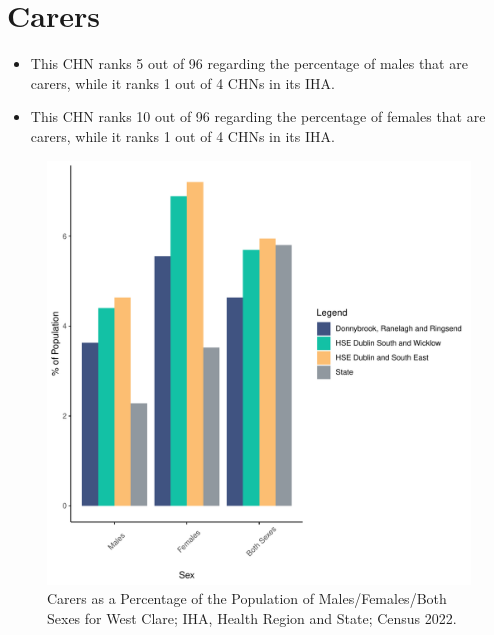 \documentclass{article}
\begin{document}
\section{Carers}\label{sect:Carers}
\begin{itemize}
\item This CHN ranks  5 out of 96 regarding the percentage of males that are carers, while it ranks   1 out of 4 CHNs in its IHA.
\item This CHN ranks  10 out of 96 regarding the percentage of females that are carers, while it ranks   1 out of 4 CHNs in its IHA.
\end{itemize}
\begin{figure}[H]
	\centering
	\includegraphics[width = 150mm]{../figures/CareED.pdf}
	\caption{Carers as a Percentage of the Population of Males/Females/Both Sexes for West Clare; IHA, Health Region and State; Census 2022.}
	\label{fig:2ae19629-1a6a-13a3-e055-000000000001}
	\end{figure}
\end{document}
